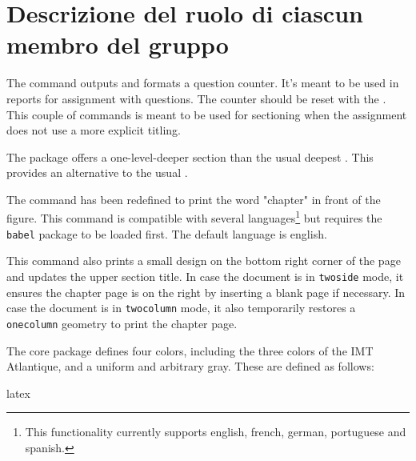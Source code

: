 \documentclass{report}
\begin{document}
\section{Descrizione del ruolo di ciascun membro del gruppo}






The  command outputs and formats a question counter.
It's meant to be used in reports for assignment with questions.
The counter should be reset with the .
This couple of commands is meant to be used for sectioning when the assignment does not use a more explicit titling.


The  package offers a one-level-deeper section than the usual deepest .
This provides an alternative to the usual .


The  command has been redefined to print the word "chapter" in front of the figure. 
This command is compatible with several languages\footnote{This functionality currently supports english, french, german, portuguese and spanish.} but requires the \texttt{babel} package to be loaded first. 
The default language is english.

This command also prints a small design on the bottom right corner of the page and updates the upper section title. 
In case the document is in \texttt{twoside} mode, it ensures the chapter page is on the right by inserting a blank page if necessary. 
In case the document is in \texttt{twocolumn} mode, it also temporarily restores a \texttt{onecolumn} geometry to print the chapter page.



The core package defines four colors, including the three colors of the IMT Atlantique, and a uniform and arbitrary gray.
These are defined as follows:

\begin{imtaCode}{latex}
\end{imtaCode}
\end{document}
